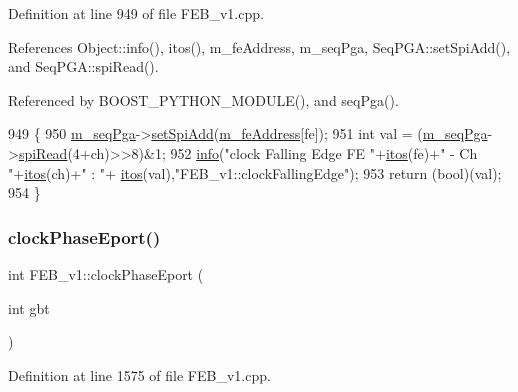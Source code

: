 Definition at line 949 of file F\+E\+B\+\_\+v1.\+cpp.



References Object\+::info(), itos(), m\+\_\+fe\+Address, m\+\_\+seq\+Pga, Seq\+P\+G\+A\+::set\+Spi\+Add(), and Seq\+P\+G\+A\+::spi\+Read().



Referenced by B\+O\+O\+S\+T\+\_\+\+P\+Y\+T\+H\+O\+N\+\_\+\+M\+O\+D\+U\+L\+E(), and seq\+Pga().


\begin{DoxyCode}
949                                               \{
950   \hyperlink{classFEB__v1_a6c7804ac86796f233a8393043adf2e77}{m\_seqPga}->\hyperlink{classSeqPGA_ac998ce3a6d9b5f2e88cc8393f8c1df53}{setSpiAdd}(\hyperlink{classFEB__v1_a4e1945c2d5b434125f375e9d0fc6d99f}{m\_feAddress}[fe]);
951   \textcolor{keywordtype}{int} val = (\hyperlink{classFEB__v1_a6c7804ac86796f233a8393043adf2e77}{m\_seqPga}->\hyperlink{classSeqPGA_ab3d0e5e5d4014bc7a92588a76b8713d4}{spiRead}(4+ch)>>8)&1;
952   \hyperlink{classObject_a644fd329ea4cb85f54fa6846484b84a8}{info}(\textcolor{stringliteral}{"clock Falling Edge FE "}+\hyperlink{Tools_8h_af330027dbdafb9a30768b3613c553e60}{itos}(fe)+\textcolor{stringliteral}{" - Ch "}+\hyperlink{Tools_8h_af330027dbdafb9a30768b3613c553e60}{itos}(ch)+\textcolor{stringliteral}{" : "}+
      \hyperlink{Tools_8h_af330027dbdafb9a30768b3613c553e60}{itos}(val),\textcolor{stringliteral}{"FEB\_v1::clockFallingEdge"});
953   \textcolor{keywordflow}{return} (\textcolor{keywordtype}{bool})(val);
954 \}
\end{DoxyCode}
\mbox{\label{classFEB__v1_a4a5b20275b96a19eba0c28d694c88ca8}} 
\subsubsection{\texorpdfstring{clock\+Phase\+Eport()}{clockPhaseEport()}\hspace{0.1cm}{\footnotesize\ttfamily [1/2]}}
{\footnotesize\ttfamily int F\+E\+B\+\_\+v1\+::clock\+Phase\+Eport (\begin{DoxyParamCaption}\item[{int}]{gbt }\end{DoxyParamCaption})}



Definition at line 1575 of file F\+E\+B\+\_\+v1.\+cpp.



